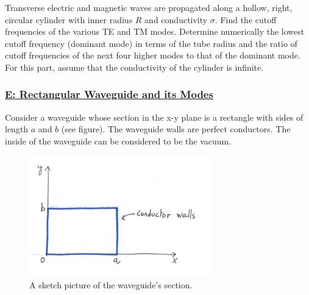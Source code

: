 Transverse electric and magnetic waves are propagated along a hollow, right, circular cylinder with inner radius $R$ and conductivity $\sigma$. Find the cutoff frequencies of the various TE and TM modes. Determine numerically the lowest cutoff frequency (dominant mode) in terms of the tube radius and the ratio of cutoff frequencies of the next four higher modes to that of the dominant mode. For this part, assume that the conductivity of the cylinder is infinite.

\subsubsection{\hyperref[E: Rectangular Waveguide and its Modes]{E: Rectangular Waveguide and its Modes}}

Consider a waveguide whose section in the x-y plane is a rectangle with sides of length $a$ and $b$ (see figure). The waveguide walls are perfect conductors. The inside of the waveguide can be considered to be the vacuum.

\begin{figure}[h]
	\includegraphics[width=8cm]{figures/examdec19p3.png}
	\centering
	\caption{A sketch picture of the waveguide's section.}
\end{figure}

